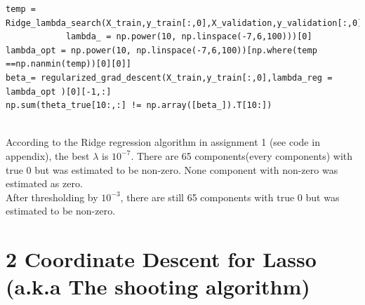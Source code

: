 \documentclass{article}
\newenvironment{problem}[2][$\bullet$]{\begin{trivlist}\large
		\item[\hskip \labelsep {\bfseries #1}\hskip \labelsep {\bfseries #2.}]}  {\end{trivlist}}
\newenvironment{sub}[2][$-$]{\begin{trivlist}
		\item[\hskip \labelsep {\bfseries #1}\hskip \labelsep {\bfseries #2.}]}  {\end{trivlist}}
\begin{document}
\begin{sub}{1.2.1}
\end{sub}
\begin{verbatim}
temp = Ridge_lambda_search(X_train,y_train[:,0],X_validation,y_validation[:,0],
			lambda_ = np.power(10, np.linspace(-7,6,100)))[0]
lambda_opt = np.power(10, np.linspace(-7,6,100))[np.where(temp  ==np.nanmin(temp))[0][0]]
beta_= regularized_grad_descent(X_train,y_train[:,0],lambda_reg = lambda_opt )[0][-1,:]
np.sum(theta_true[10:,:] != np.array([beta_]).T[10:])


\end{verbatim}


According to the Ridge regression algorithm in assignment 1 (see code in appendix), the best $\lambda $ is $ 10^{-7}$. There are 65 components(every components) with true 0 but was estimated to be non-zero. None component with non-zero was estimated as zero.  \\

After thresholding by $10^{-3}$, there are still 65 components with true 0 but was estimated to be non-zero.

\pagebreak
\section{2 Coordinate Descent for Lasso (a.k.a The shooting algorithm)}
\begin{problem}{2.1 Experiments with the Shooting Algorithm}
\end{problem}

\begin{sub}{2.1.1}
\end{sub}
\end{document}
